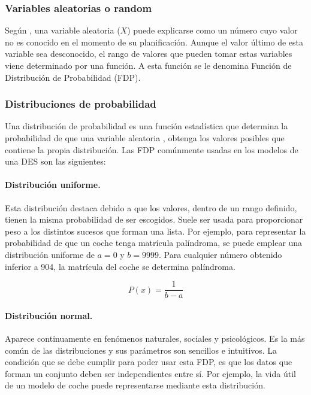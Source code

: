 \subsubsection{Variables aleatorias o random}

Según \citet{meester2008natural},
una variable aleatoria ($X$) puede explicarse
como un número cuyo valor no es conocido en el momento de su planificación.
Aunque el valor último de esta variable sea desconocido,
el rango de valores que pueden tomar estas variables
viene determinado por una función.
A esta función se le denomina Función de Distribución de Probabilidad (FDP).

\subsubsection{Distribuciones de probabilidad}\label{sec_prob_dist}

Una distribución de probabilidad es una función estadística
que determina la probabilidad de que una variable aleatoria 
\citep{simon2002probability},
obtenga los valores posibles que contiene la propia distribución.
Las FDP comúnmente usadas
en los modelos de una DES son las siguientes:

\paragraph{Distribución uniforme.} Esta distribución
destaca debido a que los valores, dentro de un rango definido,
tienen la misma probabilidad de ser escogidos.
Suele ser usada para proporcionar peso
a los distintos sucesos que forman una lista.
Por ejemplo, para representar la probabilidad de
que un coche tenga matrícula palíndroma,
se puede emplear una distribución uniforme de $a=0$ y $b=9999$.
Para cualquier número obtenido inferior a 904,
la matrícula del coche se determina palíndroma.

\begin{equation}
	P(x) = \frac{1}{b-a}
\end{equation}

\paragraph{Distribución normal.} Aparece continuamente
en fenómenos naturales, sociales y psicológicos.
Es la más común de las distribuciones
y sus parámetros son sencillos e intuitivos.
La condición que se debe cumplir para poder usar esta FDP,
es que los datos que forman un conjunto
deben ser independientes entre sí.
Por ejemplo, la vida útil de un modelo de coche
puede representarse mediante esta distribución.

